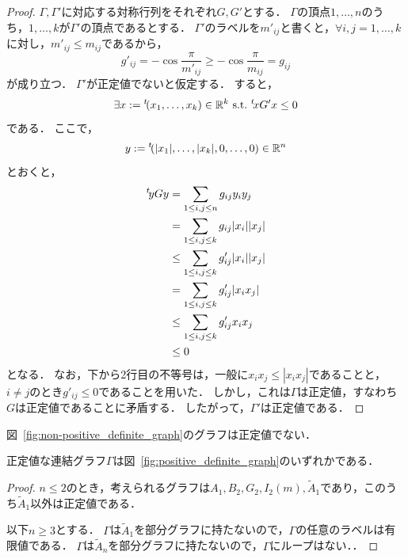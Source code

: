 \begin{proof}
  $\Gamma, \Gamma'$に対応する対称行列をそれぞれ$G, G'$とする．
  $\Gamma$の頂点$1, \ldots, n$のうち，$1, \ldots, k$が$\Gamma'$の頂点であるとする．
  $\Gamma'$のラベルを$m'_{ij}$と書くと，$\forall i, j = 1, \ldots, k$に対し，$m'_{ij} \le m_{ij}$であるから，
  \begin{equation}
    g'_{ij} = -\cos \frac{\pi}{m'_{ij}} \ge -\cos \frac{\pi}{m_{ij}} = g_{ij}
  \end{equation}
  が成り立つ．
  $\Gamma'$が正定値でないと仮定する．
  すると，
  \begin{equation}
    \exists x := {}^t\!(x_1, \ldots, x_k) \in \mathbb{R}^k \ \text{s.t.}\  {}^t\!x G' x \le 0
  \end{equation}
  である．
  ここで，
  \begin{equation}
    y := {}^t\!(|x_1|, \ldots, |x_k|, 0, \ldots, 0) \in \mathbb{R}^n
  \end{equation}
  とおくと，
  \begin{align}
    {}^t\!y G y
    &= \sum_{1 \le i, j \le n} g_{ij} y_i y_j \\
    &= \sum_{1 \le i, j \le k} g_{ij} |x_i| |x_j| \\
    &\le \sum_{1 \le i, j \le k} g'_{ij} |x_i| |x_j| \\
    &= \sum_{1 \le i, j \le k} g'_{ij} |x_i x_j| \\
    &\le \sum_{1 \le i, j \le k} g'_{ij} x_i x_j \\
    &\le 0
  \end{align}
  となる．
  なお，下から2行目の不等号は，一般に$x_i x_j \le |x_i x_j|$であることと，$i \ne j$のとき$g'_{ij} \le 0$であることを用いた．
  しかし，これは$\Gamma$は正定値，すなわち$G$は正定値であることに矛盾する．
  したがって，$\Gamma'$は正定値である．
\end{proof}

\begin{lemma}
  図~\ref{fig:non-positive_definite_graph}のグラフは正定値でない．
\end{lemma}

\begin{theorem}
  正定値な連結グラフ$\Gamma$は図~\ref{fig:positive_definite_graph}のいずれかである．
\end{theorem}

\begin{proof}
  $n \le 2$のとき，考えられるグラフは$A_1, B_2, G_2, I_2(m), \widetilde{A}_1$であり，このうち$\widetilde{A}_1$以外は正定値である．

  以下$n \ge 3$とする．
  $\Gamma$は$\widetilde{A}_1$を部分グラフに持たないので，$\Gamma$の任意のラベルは有限値である．
  $\Gamma$は$\widetilde{A}_n$を部分グラフに持たないので，$\Gamma$にループはない．．
\end{proof}

